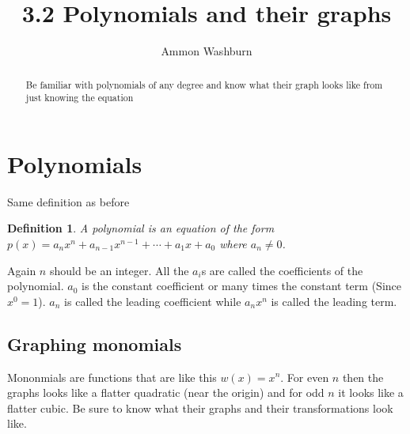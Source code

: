 \documentclass{tufte-handout}
\title{3.2 Polynomials and their graphs}
\author[AW]{Ammon Washburn}
\newtheorem{mydef}{Definition}
\begin{document}
\maketitle

\begin{abstract}
Be familiar with polynomials of any degree and know what their graph looks like from just knowing the equation
\end{abstract}

\section{Polynomials}
Same definition as before
\begin{mydef}
A polynomial is an equation of the form $p(x) = a_n x^n + a_{n-1} x^{n-1} + \cdots + a_1 x + a_0$ where $a_n \neq 0$.
\end{mydef}

Again $n$ should be an integer.  All the $a_i$s are called the coefficients of the polynomial.  $a_0$ is the constant coefficient or many times the constant term (Since $x^0 = 1$). $a_n$ is called the leading coefficient while $a_n x^n$ is called the leading term.

\subsection{Graphing monomials}

\begin{marginfigure}
\end{marginfigure}

Mononmials are functions that are like this $w(x) = x^n$.  For even $n$ then the graphs looks like a flatter quadratic (near the origin) and for odd $n$ it looks like a flatter cubic.  Be sure to know what their graphs and their transformations look like.
\end{document}
